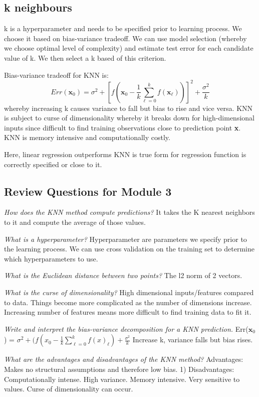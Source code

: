\documentclass[11pt, oneside]{article}
\theoremstyle{definition}
\begin{document}
\subsection{k neighbours}
k is a hyperparameter and needs to be specified prior to learning process. We choose it based on bias-variance tradeoff. We can use model selection (whereby we choose optimal level of complexity) and estimate test error for each candidate value of k. We then select a k based of this criterion.

Bias-variance tradeoff for KNN is:
$$
Err(\bm{x}_0) = \sigma^2 + [f(\bm{x}_0 - \frac{1}{k}\sum\limits_{\ell=0}^kf(\bm{x}_{\ell}))]^2 + \frac{\sigma^2}{k}
$$
whereby increasing k causes variance to fall but bias to rise and vice versa. KNN is subject to curse of dimensionality whereby it breaks down for high-dimensional inputs since difficult to find training observations close to prediction point \textbf{x}. KNN is memory intensive and computationally costly.

Here, linear regression outperforms KNN is true form for regression function is correctly specified or close to it.

\subsection{Review Questions for Module 3}
\textit{How does the KNN method compute predictions?}
It takes the K nearest neighbors to it and compute the average of those values.

\textit{What is a hyperparameter?}
Hyperparameter are parameters we specify prior to the learning process. We can use cross validation on the training set to determine which hyperparameters to use.

\textit{What is the Euclidean distance between two points?}
The l2 norm of 2 vectors.

\textit{What is the curse of dimensionality?}
High dimensional inputs/features compared to data. Things become more complicated as the number of dimensions increase. Increasing number of features means more difficult to find training data to fit it.

\textit{Write and interpret the bias-variance decomposition for a KNN prediction.}
Err($\textbf{x}_0$) = $\sigma^2 + (f(x_0 - \frac{1}{k}\sum\limits_{\ell = 0}^kf(x)_{\ell}) + \frac{\sigma^2}{k}$
Increase k, variance falls but bias rises.

\textit{What are the advantages and disadvantages of the KNN method?}
Advantages: Makes no structural assumptions and therefore low bias. 1)	Disadvantages: Computationally intense. High variance. Memory intensive. Very sensitive to values. Curse of dimensionality can occur.
\end{document}
